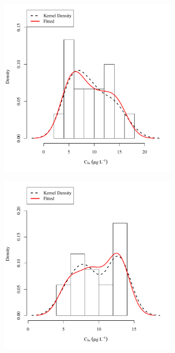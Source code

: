 \begin{linenumbers}
\subfiguretop
\begin{landscape}
	\begin{figure}
		\begin{subfigure}{0.7\textwidth}
			\centering
			\includegraphics[width=\tableCustomSize]{"Figures/Results_USR/Stochastic/Conc Model ResDist U163"}
		\end{subfigure}%
		\begin{subfigure}{0.7\textwidth}
			\centering
			\includegraphics[width=\tableCustomSize]{"Figures/Results_USR/Stochastic/Conc Model ResDist U201"}

\end{subfigure}
\end{figure}
\end{landscape}
\end{linenumbers}
